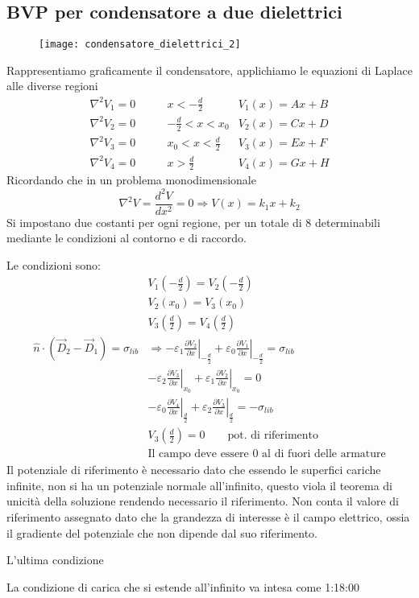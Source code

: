 \subsection{BVP per condensatore a due dielettrici}
\begin{figure}[H]
\centering
\texttt{[image: condensatore\_dielettrici\_2]}
\end{figure}
Rappresentiamo graficamente il condensatore, applichiamo le equazioni
di Laplace alle diverse regioni
\begin{align*}
\nabla^2 V_1 = 0 \qquad & x< -\frac{d}{2} & V_1(x) = Ax + B\\
\nabla^2 V_2 = 0 \qquad & -\frac{d}{2} < x < x_0 & V_2(x) = Cx + D\\
\nabla^2 V_3 = 0 \qquad & x_0 < x < \frac{d}{2} & V_3(x) = Ex + F \\
\nabla^2 V_4 = 0 \qquad & x > \frac{d}{2} & V_4(x) = Gx + H
\end{align*}
Ricordando che in un problema monodimensionale
$$
\nabla^2 V = \frac{d^2 V}{dx^2} = 0 \Rightarrow V(x) = k_1x + k_2
$$
Si impostano due costanti per ogni regione, per un totale di 8
determinabili mediante le condizioni al contorno e di raccordo.

Le condizioni sono:
\begin{align*}
&V_1\left(-\frac{d}{2}\right) = V_2\left(-\frac{d}{2}\right)\\
&V_2\left(x_0\right) = V_3\left(x_0\right)\\
&V_3\left(\frac{d}{2}\right) = V_4\left(\frac{d}{2}\right)\\
\hat{n}\cdot (\vec{D}_2-\vec{D}_1) = \sigma_{lib} &\Rightarrow 
-\varepsilon_1 \left.\frac{\partial V_2}{\partial x}\right|_{-\frac{d}{2}} +
\varepsilon_0 \left.\frac{\partial V_1}{\partial x}\right|_{-\frac{d}{2}} = 
\sigma_{lib}\\
&-\varepsilon_2 \left.\frac{\partial V_3}{\partial x}\right|_{x_0} +
\varepsilon_1 \left.\frac{\partial V_2}{\partial x}\right|_{x_0} = 
0\\
&-\varepsilon_0 \left.\frac{\partial V_4}{\partial x}\right|_{\frac{d}{2}} +
\varepsilon_2 \left.\frac{\partial V_3}{\partial x}\right|_{\frac{d}{2}} = 
-\sigma_{lib}\\
&V_3\left(\frac{d}{2}\right) = 0 \qquad \text{pot. di riferimento}\\
&\text{Il campo deve essere 0 al di fuori delle armature}
\end{align*}
Il potenziale di riferimento è necessario dato che essendo le superfici cariche 
infinite, non si ha un potenziale normale all'infinito, questo
viola il teorema di unicità della soluzione rendendo necessario il riferimento.
Non conta il valore di riferimento assegnato dato che la grandezza di interesse
è il campo elettrico, ossia il gradiente del potenziale che non dipende
dal suo riferimento.

L'ultima condizione 

La condizione di carica che si estende all'infinito va intesa come 1:18:00



